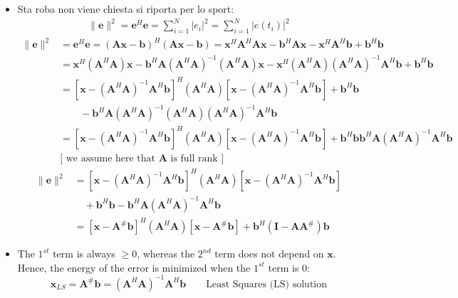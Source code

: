 \begin{itemize}
\begin{align*}
\hat{\mathbf{x}}_{LS} = \arg\min_{\mathbf{x}} \| \mathbf{e} \|^2 = \arg\min_{\mathbf{x}} \| \mathbf{A}\mathbf{x} - \mathbf{b} \|^2
\end{align*}
\item Sta roba non viene chiesta si riporta per lo sport:
\begin{align*}
\|\mathbf{e}\|^2 = \mathbf{e}^H\mathbf{e} = \sum_{i=1}^N |e_i|^2 = \sum_{i=1}^N |e(t_i)|^2
\end{align*}
\begin{align*}
\|\mathbf{e}\|^2 &= \mathbf{e}^H \mathbf{e} = (\mathbf{A}\mathbf{x} - \mathbf{b})^H (\mathbf{A}\mathbf{x} - \mathbf{b}) 
= \mathbf{x}^H \mathbf{A}^H \mathbf{A} \mathbf{x} - \mathbf{b}^H \mathbf{A} \mathbf{x} - \mathbf{x}^H \mathbf{A}^H \mathbf{b} + \mathbf{b}^H \mathbf{b} \\
&= \mathbf{x}^H (\mathbf{A}^H \mathbf{A}) \mathbf{x} - \mathbf{b}^H \mathbf{A} (\mathbf{A}^H \mathbf{A})^{-1} (\mathbf{A}^H \mathbf{A}) \mathbf{x} 
- \mathbf{x}^H (\mathbf{A}^H \mathbf{A}) (\mathbf{A}^H \mathbf{A})^{-1} \mathbf{A}^H \mathbf{b} + \mathbf{b}^H \mathbf{b} \\
&= \left[\mathbf{x} - (\mathbf{A}^H \mathbf{A})^{-1} \mathbf{A}^H \mathbf{b}\right]^H (\mathbf{A}^H \mathbf{A}) \left[\mathbf{x} - (\mathbf{A}^H \mathbf{A})^{-1} \mathbf{A}^H \mathbf{b}\right] + \mathbf{b}^H \mathbf{b} \\
&\qquad - \mathbf{b}^H \mathbf{A} (\mathbf{A}^H \mathbf{A})^{-1} (\mathbf{A}^H \mathbf{A}) (\mathbf{A}^H \mathbf{A})^{-1} \mathbf{A}^H \mathbf{b} \\
&= \left[\mathbf{x} - (\mathbf{A}^H \mathbf{A})^{-1} \mathbf{A}^H \mathbf{b}\right]^H (\mathbf{A}^H \mathbf{A}) \left[\mathbf{x} - (\mathbf{A}^H \mathbf{A})^{-1} \mathbf{A}^H \mathbf{b}\right] + \mathbf{b}^H \mathbf{b}  \mathbf{b}^H \mathbf{A} (\mathbf{A}^H \mathbf{A})^{-1} \mathbf{A}^H \mathbf{b}\quad\\
&\text{[ we assume here that $\mathbf{A}$ is full rank ]}
\end{align*}
\begin{align*}
\|\mathbf{e}\|^2
    &= \left[\mathbf{x} - (\mathbf{A}^H \mathbf{A})^{-1} \mathbf{A}^H \mathbf{b}\right]^H (\mathbf{A}^H \mathbf{A}) \left[\mathbf{x} - (\mathbf{A}^H \mathbf{A})^{-1} \mathbf{A}^H \mathbf{b}\right] \\
    &\quad + \mathbf{b}^H \mathbf{b} - \mathbf{b}^H \mathbf{A} (\mathbf{A}^H \mathbf{A})^{-1} \mathbf{A}^H \mathbf{b} \\[2ex]
    &= \left[\mathbf{x} - \mathbf{A}^\# \mathbf{b}\right]^H (\mathbf{A}^H \mathbf{A}) \left[\mathbf{x} - \mathbf{A}^\# \mathbf{b}\right]
    + \mathbf{b}^H \left( \mathbf{I} - \mathbf{A} \mathbf{A}^\# \right) \mathbf{b}
\end{align*}
    \item The \(1^{st}\) term is always \(\geq\)0, whereas the \(2^{nd}\) term does not depend on \(\mathbf{x}\). Hence, the energy of the error is minimized when the \(1^{st}\) term is 0:
\[
\hat{\mathbf{x}}_{LS} = \mathbf{A}^{\#} \mathbf{b} = \left( \mathbf{A}^{H} \mathbf{A} \right)^{-1} \mathbf{A}^{H} \mathbf{b}
\qquad \text{Least Squares (LS) solution}
\]


\end{itemize}
